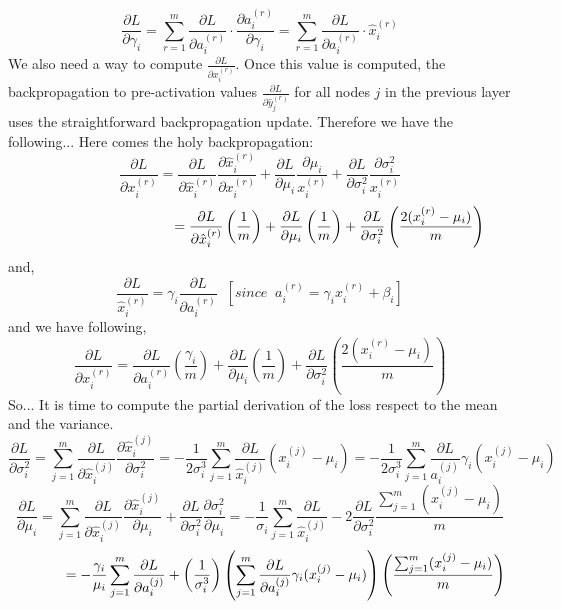 \documentclass[11pt]{article}
\begin{document}
$$\frac{\partial L}{\partial \gamma_i} = \sum_{r=1}^{m}\frac{\partial L}{\partial a_i^{(r)}} \cdot \frac{\partial a_i^{(r)}}{\partial \gamma_i} = \sum_{r=1}^{m}\frac{\partial L}{\partial a_i^{(r)}} \cdot \hat{x}_i^{(r)}$$
We also need a way to compute $\frac{\partial L}{\partial x_i^{(r)}}$. Once this value is computed, the backpropagation to pre-activation values $\frac{\partial L}{\partial \hat{y}_j^{(r)}}$ for all nodes $j$ in the previous layer uses the straightforward backpropagation update. Therefore we have the following... Here comes the holy backpropagation:
$$\frac{\partial L}{\partial x_i^{(r)}} = \frac{\partial L}{\partial \hat{x}_i^{(r)}} \frac{\partial \hat{x}_i^{(r)}}{\partial x_i^{(r)}} + \frac{\partial L}{\partial \mu_i}\frac{\partial \mu_i}{x_i^{(r)}} + \frac{\partial L}{\partial \sigma_i^2}\frac{\partial \sigma_i^2}{x_i^{(r)}}$$
$$\hspace{3.5cm} =\frac{\partial L}{\partial \hat{x}_i^{(r)}} \left(\frac{1}{m}\right) + \frac{\partial L}{\partial \mu_i} \left(\frac{1}{m}\right)+\frac{\partial L}{\partial \sigma_i^2} \left(\frac{2(x_i^{(r)} - \mu_i)}{m}\right) $$
and,
$$\frac{\partial L}{\hat{x}_i^{(r)}} = \gamma_i \frac{\partial L}{\partial a_i^{(r)}} \;\;[since\;\; a_i^{(r)} = \gamma_i x_i^{(r)} + \beta_i]$$
and we have following,
$$ \frac{\partial L}{\partial x_i^{(r)}}=\frac{\partial L}{\partial a_i^{(r)}} \left(\frac{\gamma_i}{m}\right) + \frac{\partial L}{\partial \mu_i} \left(\frac{1}{m}\right)+\frac{\partial L}{\partial \sigma_i^2} \left(\frac{2(x_i^{(r)} - \mu_i)}{m}\right)$$
So... It is time to compute the partial derivation of the loss respect to the mean and the variance. 
$$\frac{\partial L}{\partial \sigma_i^2} = \sum_{j=1}^{m}\frac{\partial L}{\partial \hat{x}_i^{(j)}}\frac{\partial \hat{x}_i^{(j)}}{\partial \sigma_i^2} = -\frac{1}{2\sigma_i^3}\sum_{j=1}^{m}\frac{\partial L}{\hat{x}_i^{(j)}}(x_i^{(j)} - \mu_i) = -\frac{1}{2\sigma_i^3}\sum_{j=1}^{m}\frac{\partial L}{a_i^{(j)}}\gamma_i(x_i^{(j)} - \mu_i)$$
$$\frac{\partial L}{\partial \mu_i} = \sum_{j=1}^{m} \frac{\partial L}{\partial \hat{x}_i^{(j)}} \frac{\partial \hat{x}_i^{(j)}}{\partial \mu_i} + \frac{\partial L}{\partial \sigma_i^2}\frac{\partial \sigma_i^2 }{\partial \mu_i} = -\frac{1}{\sigma_i}\sum_{j=1}^{m}\frac{\partial L }{\hat{x}_i^{(j)}}-2\frac{\partial L}{\partial \sigma_i^2}\frac{\sum_{j=1}^{m}(x_i^{(j)} - \mu_i)}{m}$$
$$\hspace{1.3cm}=-\frac{\gamma_i}{\mu_i}\sum_{j=1}^{m}\frac{\partial L}{\partial a_i^{(j)}}+\left(\frac{1}{\sigma_i^3}\right)\left(\sum_{j=1}^{m}\frac{\partial L}{\partial a_i^{(j)}}\gamma_i(x_i^{(j)} - \mu_i)\right) \left(\frac{\sum_{j=1}^{m}(x_i^{(j)} - \mu_i)}{m}\right)$$
\end{document}
